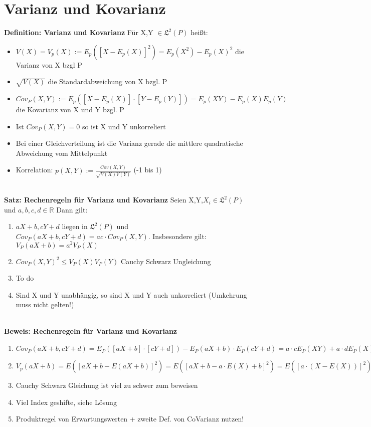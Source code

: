 \documentclass[a4paper,11pt]{scrartcl}
\begin{document}
\section{Varianz und Kovarianz}

\textbf{Definition: Varianz und Kovarianz}
Für X,Y $\in \mathfrak{L}^2(P)$ heißt:
\begin{itemize}
    \item $V(X) = V_p(X) := E_p([X-E_p(X)]^2) = E_p(X^2) - E_p(X)^2$ die Varianz von X bzgl P
    \item $\sqrt{V(X)}$ die Standardabweichung von X bzgl. P
    \item $Cov_P(X,Y) := E_p([X-E_p(X)] \cdot [Y-E_p(Y)]) = E_p(XY) - E_p(X)E_p(Y)$ die Kovarianz von X und Y bzgl. P
    \item Ist $Cov_P(X,Y) = 0$ so ist X und Y unkorreliert
    \item Bei einer Gleichverteilung ist die Varianz gerade die mittlere quadratische Abweichung vom Mittelpunkt
    \item Korrelation: $p(X,Y) := \frac{Cov(X,Y)}{\sqrt{V(X)V(Y)}}$ (-1 bis 1)
\end{itemize}

\textbf{\\Satz: Rechenregeln für Varianz und Kovarianz}
Seien X,Y,$X_i \in \mathfrak{L}^2(P)$ und $a,b,c,d \in \mathbb{R}$ Dann gilt:
\begin{enumerate}
    \item $aX +b, cY+d$ liegen in $\mathfrak{L}^2(P)$ und $Cov_P(aX+b,cY+d) = ac \cdot Cov_P(X,Y)$. 
    Insbesondere gilt: $V_P(aX+b) = a^2V_P(X)$
    \item $Cov_P(X,Y)^2 \leq V_P(X)V_P(Y)$ Cauchy Schwarz Ungleichung
    \item To do
    \item Sind X und Y unabhängig, so sind X und Y auch unkorreliert (Umkehrung muss nicht gelten!)
\end{enumerate}

\textbf{\\Beweis: Rechenregeln für Varianz und Kovarianz}
\begin{enumerate}
    \item $Cov_P(aX+b,cY+d) = E_P([aX+b] \cdot [cY+d]) - E_P(aX+b) \cdot E_P(cY+d) =a \cdot c E_P(XY) + a \cdot d E_P(X) + b \cdot c E_P(Y) + bd -(a \cdot E_P(X) + b) \cdot (c \cdot E_P(Y) +d) = a \cdot c Cov_P(X,Y)$
    \item $V_p(aX+b) = E([aX+b -E(aX+b)]^2) = E([aX+b -a \cdot E(X)+b]^2) = E([a \cdot (X-E(X))]^2) = a^2 \cdot V(X)$
    \item Cauchy Schwarz Gleichung ist viel zu schwer zum beweisen
    \item Viel Index geshifte, siehe Lösung
    \item Produktregel von Erwartungswerten + zweite Def. von CoVarianz nutzen!
\end{enumerate}
\end{document}
